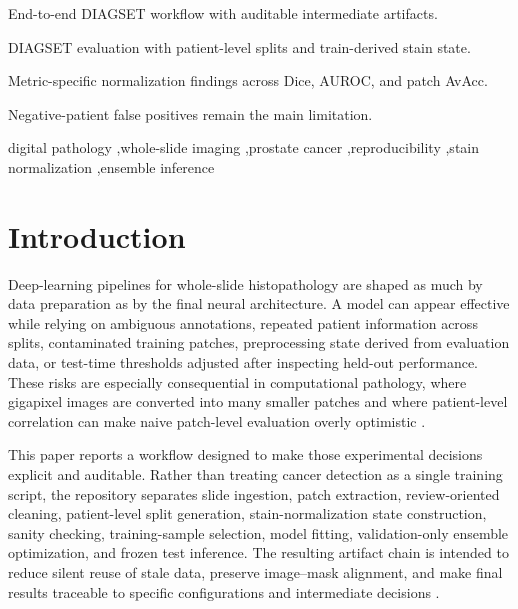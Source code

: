 \documentclass[a4paper,fleqn]{cas-dc}
\begin{document}
\begin{highlights}
\item End-to-end DIAGSET workflow with auditable intermediate artifacts.
\item DIAGSET evaluation with patient-level splits and train-derived stain state.
\item Metric-specific normalization findings across Dice, AUROC, and patch AvAcc.
\item Negative-patient false positives remain the main limitation.
\end{highlights}

\begin{keywords}
digital pathology \sep whole-slide imaging \sep prostate cancer \sep reproducibility \sep stain normalization \sep ensemble inference
\end{keywords}

\maketitle

\section{Introduction}

Deep-learning pipelines for whole-slide histopathology are shaped as much by data preparation as by the final neural architecture. A model can appear effective while relying on ambiguous annotations, repeated patient information across splits, contaminated training patches, preprocessing state derived from evaluation data, or test-time thresholds adjusted after inspecting held-out performance. These risks are especially consequential in computational pathology, where gigapixel images are converted into many smaller patches and where patient-level correlation can make naive patch-level evaluation overly optimistic \cite{roberts2017crossvalidation,dawood2026confounding}.

This paper reports a workflow designed to make those experimental decisions explicit and auditable. Rather than treating cancer detection as a single training script, the repository separates slide ingestion, patch extraction, review-oriented cleaning, patient-level split generation, stain-normalization state construction, sanity checking, training-sample selection, model fitting, validation-only ensemble optimization, and frozen test inference. The resulting artifact chain is intended to reduce silent reuse of stale data, preserve image--mask alignment, and make final results traceable to specific configurations and intermediate decisions \cite{wilkinson2016fair,piccolo2016tools}.
\end{document}
